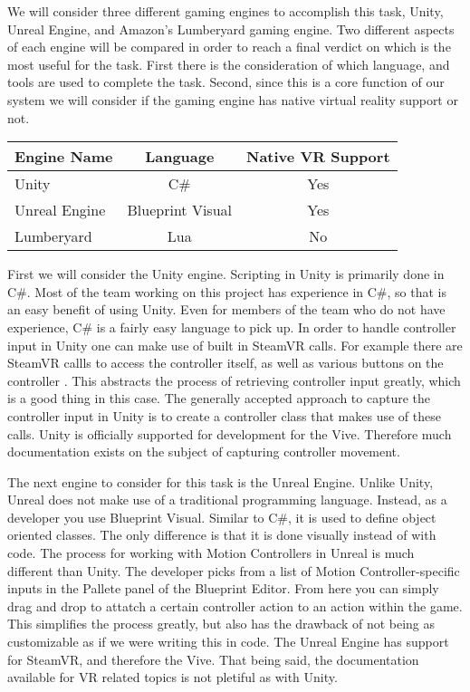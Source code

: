 \documentclass[10pt,journal,compsoc,onecolumn, draftclsnofoot]{IEEEtran}
\begin{document}
We will consider three different gaming engines to accomplish this task, Unity, Unreal Engine, and Amazon's Lumberyard gaming engine.
Two different aspects of each engine will be compared in order to reach a final verdict on which is the most useful for the task.
First there is the consideration of which language, and tools are used to complete the task.
Second, since this is a core function of our system we will consider if the gaming engine has native virtual reality support or not.

\vspace{2mm}
\begin{table}[h!]
\centering
  \begin{tabular}{ | l || c | c |  }
  \hline
  Engine Name & Language & Native VR Support\\
  \hline
  Unity  & C\# & Yes\\ \hline
  Unreal Engine & Blueprint Visual & Yes\\ \hline
  Lumberyard & Lua & No\\ \hline
  \hline
  \end{tabular}
\end{table}
\vspace{2mm}

First we will consider the Unity engine. Scripting in Unity is primarily done in C\#.
Most of the team working on this project has experience in C\#, so that is an easy benefit of using Unity.
Even for members of the team who do not have experience, C\# is a fairly easy language to pick up.
In order to handle controller input in Unity one can make use of built in SteamVR calls.
For example there are SteamVR callls to access the controller itself, as well as various buttons on the controller \cite{steamvr_controllers}.
This abstracts the process of retrieving controller input greatly, which is a good thing in this case.
The generally accepted approach to capture the controller input in Unity is to create a controller class that makes use of these calls.
Unity is officially supported for development for the Vive.
Therefore much documentation exists on the subject of capturing controller movement.

The next engine to consider for this task is the Unreal Engine.
Unlike Unity, Unreal does not make use of a traditional programming language.
Instead, as a developer you use Blueprint Visual.
Similar to C\#, it is used to define object oriented classes.
The only difference is that it is done visually instead of with code.
The process for working with Motion Controllers in Unreal is much different than Unity.
The developer picks from a list of Motion Controller-specific inputs in the Pallete panel of the Blueprint Editor\cite{unreal_controller}.
From here you can simply drag and drop to attatch a certain controller action to an action within the game.
This simplifies the process greatly, but also has the drawback of not being as customizable as if we were writing this in code.
The Unreal Engine has support for SteamVR, and therefore the Vive.
That being said, the documentation available for VR related topics is not pletiful as with Unity.
\end{document}
